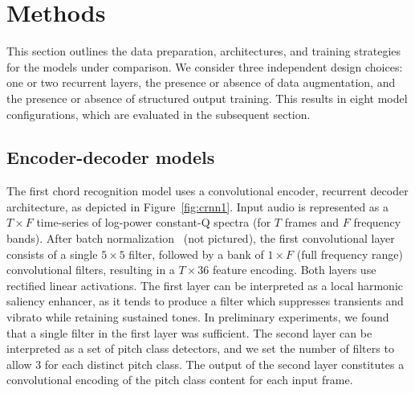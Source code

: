 \documentclass{article}
\begin{document}
\cite{mauchsimple}

\section{Methods}






This section outlines the data preparation, architectures, and training strategies for the models under comparison.
We consider three independent design choices: one or two recurrent layers, the presence or absence of data augmentation, and the presence or absence of structured output training.
This results in eight model configurations, which are evaluated in the subsequent section.

\subsection{Encoder-decoder models}


The first chord recognition model uses a convolutional encoder, recurrent decoder architecture, as depicted in Figure~\ref{fig:crnn1}.
Input audio is represented as a $T\times F$ time-series of log-power constant-Q spectra (for $T$ frames and $F$ frequency bands).
After batch normalization~\cite{ioffe2015batch} (not pictured), the first convolutional layer consists of a single $5\times5$ filter, followed by a bank of $1\times F$ (full frequency range) convolutional filters, resulting in a $T\times 36$ feature encoding.
Both layers use rectified linear activations.
The first layer can be interpreted as a local harmonic saliency enhancer, as it tends to produce a filter which suppresses transients and vibrato while retaining sustained tones.
In preliminary experiments, we found that a single filter in the first layer was sufficient.
The second layer can be interpreted as a set of pitch class detectors, and we set the number of filters to allow 3 for each distinct pitch class.
The output of the second layer constitutes a convolutional encoding of the pitch class content for each input frame.
\end{document}
